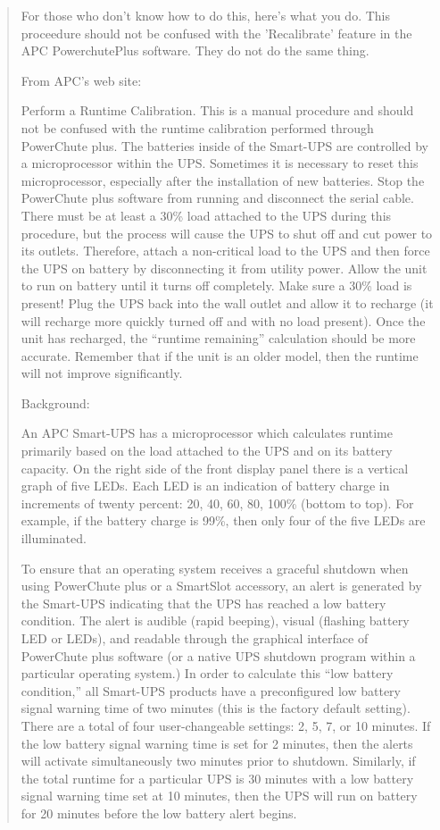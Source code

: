 \begin{quote}
For those who don't know how to do this, here's what you do. This proceedure
should not be confused with the 'Recalibrate' feature in the APC
PowerchutePlus software. They do not do the same thing.  

\gt{}From APC's web site:  

Perform a Runtime Calibration. This is a manual procedure and should not be
confused with the runtime calibration performed through PowerChute plus. The
batteries inside of the Smart-UPS are controlled by a microprocessor within
the UPS. Sometimes it is necessary to reset this microprocessor, especially
after the installation of new batteries. Stop the PowerChute plus software
from running and disconnect the serial cable. There must be at least a 30\%
load attached to the UPS during this procedure, but the process will cause the
UPS to shut off and cut power to its outlets. Therefore, attach a non-critical
load to the UPS and then force the UPS on battery by disconnecting it from
utility power. Allow the unit to run on battery until it turns off completely.
Make sure a 30\% load is present! Plug the UPS back into the wall outlet and
allow it to recharge (it will recharge more quickly turned off and with no
load present). Once the unit has recharged, the ``runtime remaining''
calculation should be more accurate. Remember that if the unit is an older
model, then the runtime will not improve significantly.  

Background:  

An APC Smart-UPS has a microprocessor which calculates runtime primarily based
on the load attached to the UPS and on its battery capacity. On the right side
of the front display panel there is a vertical graph of five LEDs. Each LED is
an indication of battery charge in increments of twenty percent: 20, 40, 60,
80, 100\% (bottom to top). For example, if the battery charge is 99\%, then
only four of the five LEDs are illuminated.  

To ensure that an operating system receives a graceful shutdown when using
PowerChute plus or a SmartSlot accessory, an alert is generated by the
Smart-UPS indicating that the UPS has reached a low battery condition. The
alert is audible (rapid beeping), visual (flashing battery LED or LEDs), and
readable through the graphical interface of PowerChute plus software (or a
native UPS shutdown program within a particular operating system.) In order to
calculate this ``low battery condition,'' all Smart-UPS products have a
preconfigured low battery signal warning time of two minutes (this is the
factory default setting). There are a total of four user-changeable settings:
2, 5, 7, or 10 minutes. If the low battery signal warning time is set for 2
minutes, then the alerts will activate simultaneously two minutes prior to
shutdown. Similarly, if the total runtime for a particular UPS is 30 minutes
with a low battery signal warning time set at 10 minutes, then the UPS will
run on battery for 20 minutes before the low battery alert begins.  


\end{quote}
